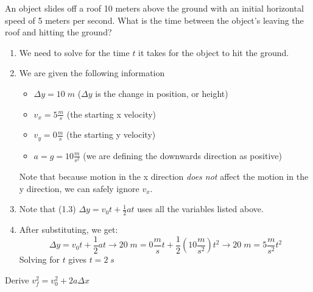 
\begin{question}
An object slides off a roof 10 meters above the ground with an initial horizontal speed of 5 meters per second. What is the time between the object's leaving the roof and hitting the ground? 
\end{question}

\begin{solution}
\begin{enumerate}
  \item We need to solve for the time $t$ it takes for the object to hit the ground.
  \item We are given the following information
  \begin{itemize}
      \item $\Delta y = 10\;m$ ($\Delta y$ is the change in position, or height)
      \item $v_x = 5\frac{m}{s}$ (the starting x velocity)
      \item $v_y = 0\frac{m}{s}$ (the starting y velocity)
      \item $a = g = 10\frac{m}{s^2}$ (we are defining the downwards direction as positive)
  \end{itemize}
  Note that because motion in the x direction \emph{does not} affect the motion in the y direction, we can safely ignore $v_x$.
  \item Note that (1.3) $\Delta y = v_0t + \frac{1}{2}at$ uses all the variables listed above.
  \item After substituting, we get:
  \begin{equation*}
  \Delta y = v_0t + \frac{1}{2}at \rightarrow 
  20\;m = 0\frac{m}{s}t + \frac{1}{2}(10 \frac{m}{s^2})t^2 \rightarrow
  20\;m = 5\frac{m}{s^2}t^2
  \end{equation*}
  Solving for $t$ gives $t=2\;s$
\end{enumerate}

\end{solution}


\begin{question}
Derive $v_f^2 = v_0^2 + 2a\Delta x$
\end{question}

